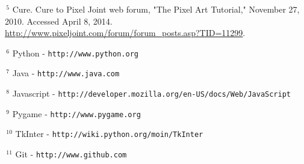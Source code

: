 \documentclass{article}
\begin{document}
\vspace{.3em}

\noindent
\hangindent=1cm
$\,^5$
Cure. Cure to Pixel Joint web forum, "The Pixel Art Tutorial," November 27, 2010. Accessed April 8, 2014. \url{http://www.pixeljoint.com/forum/forum_posts.asp?TID=11299}. 

\vspace{.3em}

\noindent
$\,^6$
Python - {\tt http://www.python.org}

\vspace{.3em}

\noindent
$\,^7$
Java - {\tt http://www.java.com}

\vspace{.3em}

\noindent
$\,^8$
Javascript - {\tt http://developer.mozilla.org/en-US/docs/Web/JavaScript}

\vspace{.3em}

\noindent
$\,^9$
Pygame - {\tt http://www.pygame.org}

\vspace{.3em}

\noindent
$\,^{10}$
TkInter - {\tt http://wiki.python.org/moin/TkInter}

\vspace{.3em}

\noindent
$\,^{11}$
Git - {\tt http://www.github.com}

\vspace{.3em}
\end{document}

